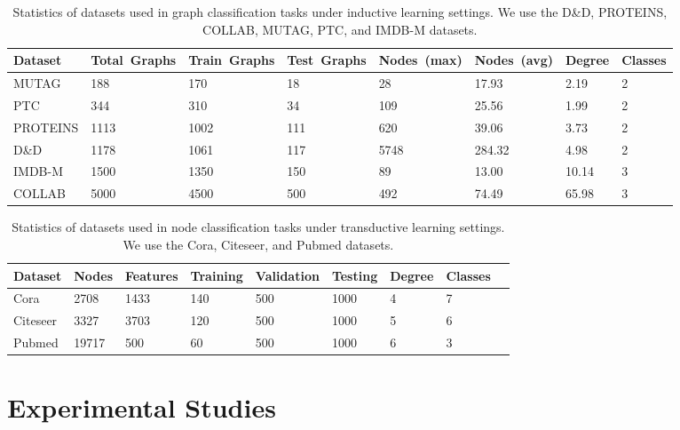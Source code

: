 \documentclass[sigconf]{acmart}
\begin{document}
\begin{table*}[t]
\centering \caption{Statistics of datasets used in graph classification tasks under inductive
learning settings. We use the D\&D, PROTEINS, COLLAB, MUTAG, PTC, and IMDB-M datasets.
}\label{table:inducdatasets}
\begin{tabularx}{\textwidth}{  XYYYYYYY }
    \hline
    \textbf{Dataset} & \textbf{Total~Graphs} & \textbf{Train~Graphs} & \textbf{Test~Graphs} &
    \textbf{Nodes~(max)} & \textbf{Nodes~(avg)} & \textbf{Degree} & \textbf{Classes} \\ \hline\hline
    MUTAG     & 188  & 170  & 18   & 28   & 17.93   & 2.19  & 2  \\ \hline
    PTC       & 344  & 310  & 34   & 109  & 25.56   & 1.99  & 2  \\ \hline
    PROTEINS  & 1113 & 1002 & 111  & 620  & 39.06   & 3.73  & 2  \\ \hline
    D\&D      & 1178 & 1061 & 117  & 5748 & 284.32  & 4.98  & 2  \\ \hline
    IMDB-M    & 1500 & 1350 & 150  & 89   & 13.00   & 10.14 & 3  \\ \hline
    COLLAB    & 5000 & 4500 & 500  & 492  & 74.49   & 65.98 & 3  \\ \hline
    \hline
\end{tabularx}
\end{table*}

\begin{table*}[t]
\centering \caption{Statistics of datasets used in node classification tasks under transductive
learning settings. We use the Cora, Citeseer, and Pubmed datasets.}\label{table:transdatasets}
\begin{tabularx}{\textwidth}{  XYYYYYYYY }
    \hline
    \textbf{Dataset} & \textbf{Nodes} &
    \textbf{Features} & \textbf{Training} &
    \textbf{Validation} & \textbf{Testing} & \textbf{Degree} & \textbf{Classes} \\ \hline\hline
    Cora      & 2708   & 1433 & 140   & 500 & 1000 & 4 & 7    \\ \hline
    Citeseer  & 3327   & 3703 & 120   & 500 & 1000 & 5 & 6    \\ \hline
    Pubmed    & 19717  & 500  & 60    & 500 & 1000 & 6 & 3    \\ \hline
    \hline
\end{tabularx}
\end{table*}




\section{Experimental Studies}
\end{document}
